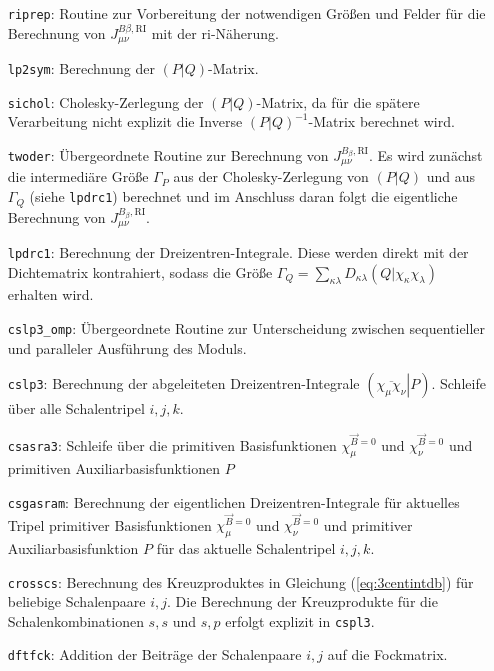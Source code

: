 	\begin{itemize}[leftmargin=65pt]
	    \item[\texttt{riprep}:] Routine zur Vorbereitung der notwendigen Größen und Felder für die Berechnung von $J_{\mu\nu}^{B\beta ,\textrm{RI}}$ mit der \ac{ri}-Näherung. 
	    \item[\texttt{lp2sym}:] Berechnung der $\left(P\vert Q\right)$-Matrix.
	    \item[\texttt{sichol}:] Cholesky-Zerlegung der $\left(P\vert Q\right)$-Matrix, da für die spätere Verarbeitung nicht explizit die Inverse $\left(P\vert Q\right)^{-1}$-Matrix berechnet wird.
	    \item[\texttt{twoder}:] Übergeordnete Routine zur Berechnung von $J_{\mu\nu}^{B_\beta ,\textrm{RI}}$. Es wird zunächst die intermediäre Größe $\Gamma_P$ aus der Cholesky-Zerlegung von $\left(P\vert Q\right)$ und aus $\Gamma_Q$ (siehe \texttt{lpdrc1}) berechnet und im Anschluss daran folgt die eigentliche Berechnung von $J_{\mu\nu}^{B_\beta ,\textrm{RI}}$.
	    \item[\texttt{lpdrc1}:] Berechnung der Dreizentren-Integrale. Diese werden direkt mit der Dichtematrix kontrahiert, sodass die Größe $\Gamma_Q=\sum_{\kappa\lambda}D_{\kappa\lambda}\left(Q\vert\chi_\kappa\chi_\lambda\right)$ erhalten wird.
	    \item[\texttt{cslp3\_omp}:] Übergeordnete Routine zur Unterscheidung zwischen sequentieller und paralleler Ausführung des Moduls.
	    \item[\texttt{cslp3}:] Berechnung der abgeleiteten Dreizentren-Integrale $\left(\left.\overline{\chi_\mu\chi_\nu}\right\vert P\right)$. Schleife über alle Schalentripel $i,j,k$.
	    \item[\texttt{csasra3}:] Schleife über die primitiven Basisfunktionen $\chi_\mu^{\vec{B}=0}$ und $\chi_\nu^{\vec{B}=0}$ und primitiven Auxiliarbasisfunktionen $P$
	    \item[\texttt{csgasram}:] Berechnung der eigentlichen Dreizentren-Integrale für aktuelles Tripel primitiver Basisfunktionen $\chi_\mu^{\vec{B}=0}$ und $\chi_\nu^{\vec{B}=0}$ und primitiver Auxiliarbasisfunktion $P$ für das aktuelle Schalentripel $i,j,k$.
	    \item[\texttt{crosscs}:] Berechnung des Kreuzproduktes in Gleichung (\ref{eq:3centintdb}) für beliebige Schalenpaare $i,j$. Die Berechnung der Kreuzprodukte für die Schalenkombinationen $s,s$ und $s,p$ erfolgt explizit in \texttt{cspl3}.
	    \item[\texttt{dftfck}:] Addition der Beiträge der Schalenpaare $i,j$ auf die Fockmatrix.
	\end{itemize}
	

